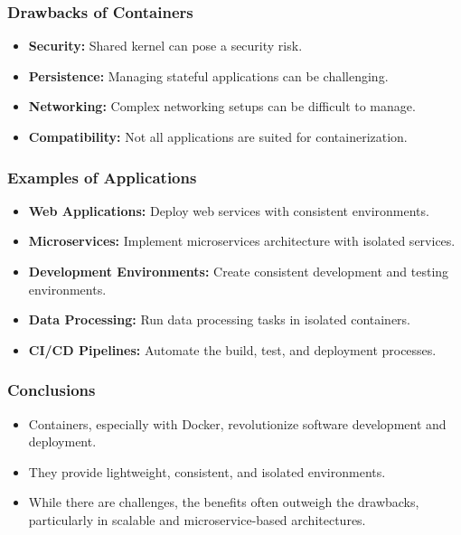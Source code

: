 \documentclass[aspectratio=169, table]{beamer}
\begin{document}
    \begin{frame}
        \frametitle{Drawbacks of Containers}
        \begin{itemize}
            \item \textbf{Security:} Shared kernel can pose a security risk.
            \item \textbf{Persistence:} Managing stateful applications can be challenging.
            \item \textbf{Networking:} Complex networking setups can be difficult to manage.
            \item \textbf{Compatibility:} Not all applications are suited for containerization.
        \end{itemize}
    \end{frame}


    \begin{frame}
        \frametitle{Examples of Applications}
        \begin{itemize}
            \item \textbf{Web Applications:} Deploy web services with consistent environments.
            \item \textbf{Microservices:} Implement microservices architecture with isolated services.
            \item \textbf{Development Environments:} Create consistent development and testing environments.
            \item \textbf{Data Processing:} Run data processing tasks in isolated containers.
            \item \textbf{CI/CD Pipelines:} Automate the build, test, and deployment processes.
        \end{itemize}
    \end{frame}


    \begin{frame}
        \frametitle{Conclusions}
        \begin{itemize}
            \item Containers, especially with Docker, revolutionize software development and deployment.
            \item They provide lightweight, consistent, and isolated environments.
            \item While there are challenges, the benefits often outweigh the drawbacks, particularly in scalable and microservice-based architectures.
        \end{itemize}
    \end{frame}
\end{document}
